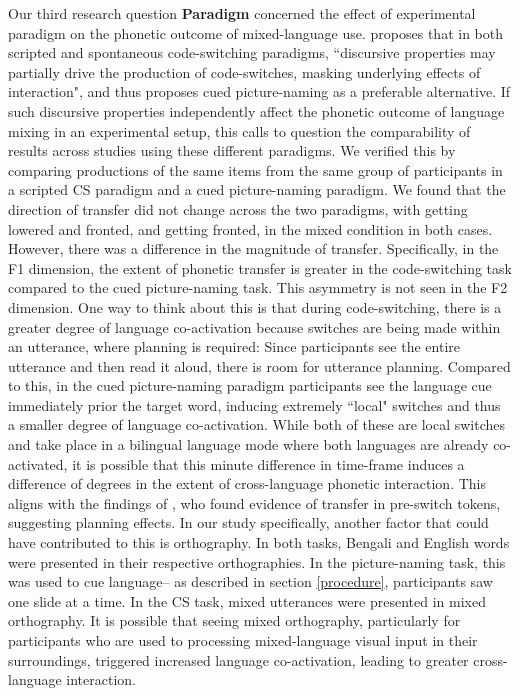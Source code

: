 \documentclass[12 pt]{article}
\newcommand{\nt}[1]{\textipa{[#1]}} %
\begin{document}
Our third research question \textbf{Paradigm} concerned the effect of experimental paradigm on the phonetic outcome of mixed-language use. \cite{olson2013bilingual} proposes that in both scripted and spontaneous code-switching paradigms, ``discursive properties may partially drive the production of code-switches, masking underlying effects of interaction", and thus proposes cued picture-naming as a preferable alternative. If such discursive properties independently affect the phonetic outcome of language mixing in an experimental setup, this calls to question the comparability of results across studies using these different paradigms. We verified this by comparing productions of the same items from the same group of participants in a scripted CS paradigm and a cued picture-naming paradigm. We found that the direction of transfer did not change across the two paradigms, with \nt{2} getting lowered and fronted, and \nt{\ae} getting fronted, in the mixed condition in both cases. However, there was a difference in the magnitude of transfer. Specifically, in the F1 dimension, the extent of phonetic transfer is greater in the code-switching task compared to the cued picture-naming task. This asymmetry is not seen in the F2 dimension.
One way to think about this is that during code-switching, there is a greater degree of language co-activation because switches are being made within an utterance, where planning is required: Since participants see the entire utterance and then read it aloud, there is room for utterance planning. Compared to this, in the cued picture-naming paradigm participants see the language cue immediately prior the target word, inducing extremely ``local" switches and thus a smaller degree of language co-activation. While both of these are local switches and take place in a bilingual language mode where both languages are already co-activated, it is possible that this minute difference in time-frame induces a difference of degrees in the extent of cross-language phonetic interaction. This aligns with the findings of \cite{bullock2009trying}, who found evidence of transfer in pre-switch tokens, suggesting planning effects. In our study specifically, another factor that could have contributed to this is orthography. In both tasks, Bengali and English words were presented in their respective orthographies. In the picture-naming task, this was used to cue language-- as described in  section \ref{procedure}, participants saw one slide at a time. In the CS task, mixed utterances were presented in mixed orthography. It is possible that seeing mixed orthography, particularly for participants who are used to processing mixed-language visual input in their surroundings, triggered increased language co-activation, leading to greater cross-language interaction.
\end{document}
